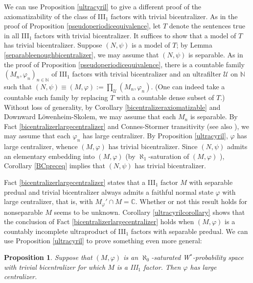\documentclass[12pt]{amsart}
\newtheorem{prop}[thm]{Proposition}
\theoremstyle{definition}
\def\bb{\mathbb}
\def\bb{\mathbb}
\def\cal{\mathcal}
\newcommand\cU{{\cal U}}
\begin{document}
We can use Proposition \ref{ultracyril} to give a different proof of the axiomatizability of the class of III$_1$ factors with trivial bicentralizer.  As in the proof of Proposition \ref{pseudoperiodicequivalence}, let $T$ denote the sentences true in all III$_1$ factors with trivial bicentralizer.  It suffices to show that a model of $T$ has trivial bicentralizer.  Suppose $(N,\psi)$ is a model of $T$; by Lemma \ref{separableenoughbicentralizer}, we may assume that $(N,\psi)$ is separable.  As in the proof of Proposition \ref{pseudoperiodicequivalence}, there is a countable family $(M_n,\varphi_n)_{n\in \bb N}$ of III$_1$ factors with trivial bicentralizer and an ultrafilter $\cU$ on $\mathbb N$ such that $(N,\psi)\equiv (M,\varphi):=\prod_\cU (M_n,\varphi_n)$.  (One can indeed take a countable such family by replacing $T$ with a countable dense subset of $T$.)  Without loss of generality, by Corollary \ref{bicentralizeraxiomatizable} and Downward L\"owenheim-Skolem, we may assume that each $M_n$ is separable.  By Fact \ref{bicentralizerlargecentralizer}
and Connes-Stormer transitivity (see also \cite[Proposition 3.12]{goldbringhoudayer}), we may assume that each $\varphi_n$ has large centralizer.  By Proposition \ref{ultracyril}, $\varphi$ has large centralizer, whence $(M,\varphi)$ has trivial bicentralizer.  Since $(N,\psi)$ admits an elementary embedding into $(M,\varphi)$ (by $\aleph_1$-saturation of $(M,\varphi)$  \cite[Proposition 7.6]{yaacov2008model}), Corollary \ref{BCpreceq} implies that $(N,\psi)$ has trivial bicentralizer.

Fact \ref{bicentralizerlargecentralizer} states that a III$_1$ factor $M$ with separable predual and trivial bicentralizer always admits a faithful normal state $\varphi$ with large centralizer, that is, with $M_\varphi'\cap M=\bb C$.  Whether or not this result holds for nonseparable $M$ seems to be unknown.  Corollary \ref{ultracyrilcorollary} shows that the conclusion of Fact \ref{bicentralizerlargecentralizer} holds when $(M,\varphi)$ is a countably incomplete ultraproduct of III$_1$ factors with separable predual.  We can use Proposition \ref{ultracyril} to prove something even more general:

\begin{prop}
Suppose that $(M,\varphi)$ is an $\aleph_0$-saturated W$^*$-probability space with trivial bicentralizer for which $M$ is a III$_1$ factor.  Then $\varphi$ has large centralizer.
\end{prop}
\end{document}

